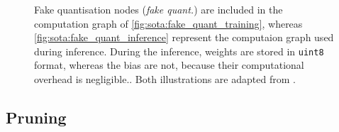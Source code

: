 \begin{figure}[htbp]
\centering
{}
\caption{Fake quantisation nodes (\emph{fake quant.}) are included in the
computation graph of \cref{fig:sota:fake_quant_training}, whereas
\cref{fig:sota:fake_quant_inference} represent the computaion graph used during
inference. During the inference, weights are stored in \texttt{uint8} format,
whereas the bias are not, because their computational overhead is
negligible.\cite{DBLP:conf/cvpr/JacobKCZTHAK18}. Both illustrations are adapted
from \cite{DBLP:conf/cvpr/JacobKCZTHAK18}.}
\label{fig:sota:fake_quant}
\end{figure}

\subsection{Pruning}
\label{sec:sota:pruning}


